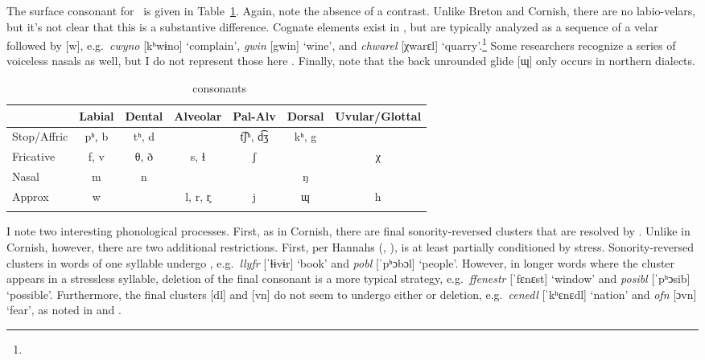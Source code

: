 \documentclass[output=paper,colorlinks,citecolor=brown]{langscibook}
\begin{document}
The surface consonant  for \w\ is given in Table~\ref{welsh.consonants.tab}. Again, note the absence of a  contrast. Unlike Breton and Cornish, there are no labio-velars, but it's not clear that this is a substantive difference. Cognate elements exist in \w, but are typically analyzed as a sequence of a velar followed by [w], e.g.\ \emph{cwyno} [kʰwɨno] `complain', \emph{gwin} [gwin] `wine', and \emph{chwarel} [χwarɛl] `quarry'.\footnote{} Some researchers recognize a series of voiceless nasals as well, but I do not represent those here \citep{hammond.h}. Finally, note that the back unrounded glide [ɰ] only occurs in northern dialects.

\begin{table}
\caption{\w\ consonants}
\label{welsh.consonants.tab}
\begin{tabular}[t]{lcccccc}
\lsptoprule
             & Labial & Dental & Alveolar & Pal-Alv  & Dorsal & Uvular/Glottal \\
\midrule
Stop/Affric  & pʰ, b   & tʰ, d   &          & t͡ʃʰ, d͡ʒ & kʰ, g \\
Fricative    & f, v    & θ, ð    & s, ɬ      & ʃ        &        & χ \\
Nasal        & m      & n      &          &          & ŋ  \\
Approx       & w      &        & l, r, r̥    & j        & ɰ      & h \\
\lspbottomrule
\end{tabular}
\end{table}

I note two interesting phonological processes. First, as in Cornish, there are final sonority-reversed clusters that are resolved by . Unlike in Cornish, however, there are two additional restrictions. First, per Hannahs (\citeyear{welshsvara}, \citeyear{unity.hannahs}),  is at least partially conditioned by stress. Sonority-reversed clusters in words of one syllable undergo , e.g.\ \emph{llyfr} [ˈɬɨvɨr] `book' and \emph{pobl} [ˈpʰɔbɔl] `people'. However, in longer words where the cluster appears in a stressless syllable, deletion of the final consonant is a more typical strategy, e.g.\ \emph{ffenestr} [ˈfɛnɛst] `window' and \emph{posibl} [ˈpʰɔsib] `possible'. Furthermore, the final clusters [dl] and [vn] do not seem to undergo either  or deletion, e.g.\ \emph{cenedl} [ˈkʰɛnɛdl] `nation' and \emph{ofn} [ɔvn] `fear', as noted in \citet{hannahs.book} and \citet{iosad.svara}.
\end{document}
